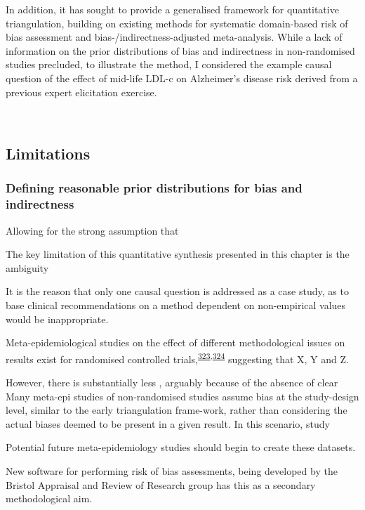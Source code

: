 \documentclass[a4paper, twoside]{templates/ociamthesis}
\begin{document}
In addition, it has sought to provide a generalised framework for quantitative triangulation, building on existing methods for systematic domain-based risk of bias assessment and bias-/indirectness-adjusted meta-analysis. While a lack of information on the prior distributions of bias and indirectness in non-randomised studies precluded, to illustrate the method, I considered the example causal question of the effect of mid-life LDL-c on Alzheimer's disease risk derived from a previous expert elicitation exercise.

~

\hypertarget{limitations-2}{%
\subsection{Limitations}\label{limitations-2}}

\hypertarget{defining-reasonable-prior-distributions-for-bias-and-indirectness}{%
\subsubsection{Defining reasonable prior distributions for bias and indirectness}\label{defining-reasonable-prior-distributions-for-bias-and-indirectness}}

Allowing for the strong assumption that

The key limitation of this quantitative synthesis presented in this chapter is the ambiguity

It is the reason that only one causal question is addressed as a case study, as to base clinical recommendations on a method dependent on non-empirical values would be inappropriate.

Meta-epidemiological studies on the effect of different methodological issues on results exist for randomised controlled trials,\textsuperscript{\protect\hyperlink{ref-amer2021}{323},\protect\hyperlink{ref-page2016}{324}} suggesting that X, Y and Z.

However, there is substantially less , arguably because of the absence of clear
Many meta-epi studies of non-randomised studies assume bias at the study-design level, similar to the early triangulation frame-work, rather than considering the actual biases deemed to be present in a given result. In this scenario, study

Potential future meta-epidemiology studies should begin to create these datasets.

New software for performing risk of bias assessments, being developed by the Bristol Appraisal and Review of Research group has this as a secondary methodological aim.
\end{document}
